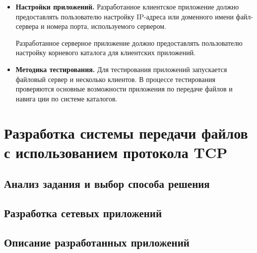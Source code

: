 \begin{itemize}
	\item \textbf{Настройки приложений.} Разработанное клиентское приложение должно предоставлять пользователю настройку IP-адреса или доменного имени файл-сервера и номера порта, используемого сервером.
	
	Разработанное серверное приложение должно предоставлять пользователю настройку корневого каталога для клиентских приложений.

	\item \textbf{Методика тестирования.} Для тестирования приложений запускается файловый сервер и несколько клиентов. В процессе тестирования проверяются основные возможности приложения по передаче файлов и навига	ции по системе каталогов.

\end{itemize}

\section{Разработка системы передачи файлов с использованием протокола TCP}

\subsection{Анализ задания и выбор способа решения}


\subsection{Разработка сетевых приложений}


\subsection{Описание разработанных приложений}

